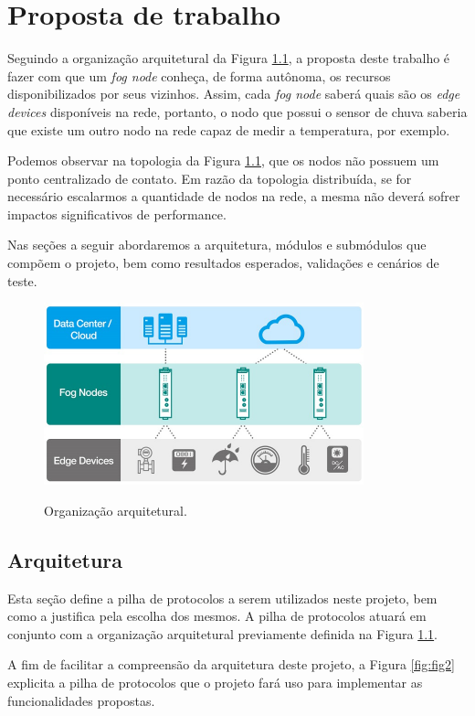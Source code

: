 \chapter{\label{chap:chap3} Proposta de trabalho}

Seguindo a organização arquitetural da Figura \ref{fig:fig1}, a proposta deste trabalho é fazer com que um \textit{fog node} conheça, de forma autônoma, os recursos disponibilizados por seus vizinhos.
Assim, cada \textit{fog node} saberá quais são os \textit{edge devices} disponíveis na rede, portanto,
o nodo que possui o sensor de chuva saberia que existe um outro nodo na rede capaz de medir a temperatura, por exemplo.


Podemos observar na topologia da Figura \ref{fig:fig1}, que os nodos não possuem um ponto centralizado de contato.
Em razão da topologia distribuída, se for necessário escalarmos a quantidade de nodos na rede, a mesma não deverá sofrer impactos significativos de performance.

Nas seções a seguir abordaremos a arquitetura, módulos e submódulos que compõem o projeto, bem como resultados esperados, validações e cenários de teste. 

\begin{figure}[htb!]
    \centering\includegraphics[width=.75\textwidth]{fig1.pdf}
    \caption
    {\label{fig:fig1} Organização arquitetural.} \cite{archfog:2017}
\end{figure}

\section{Arquitetura}

Esta seção define a pilha de protocolos a serem utilizados neste projeto, bem como a justifica pela escolha dos mesmos.
A pilha de protocolos atuará em conjunto com a organização arquitetural previamente definida na Figura \ref{fig:fig1}.

A fim de facilitar a compreensão da arquitetura deste projeto, a Figura \ref{fig:fig2} explicita a pilha de protocolos que o projeto fará uso para implementar as funcionalidades propostas.

